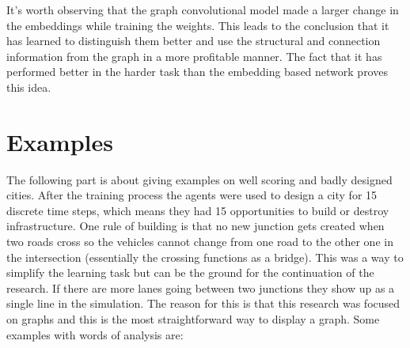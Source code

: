 \documentclass[
]{elteikthesis}[2023/04/10]
\begin{document}
It's worth observing that the graph convolutional model made a larger
change in the embeddings while training the weights. This leads to
the conclusion that it has learned to distinguish them better and
use the structural and connection information from the graph in a more profitable
manner. The fact that it has performed better in the harder task than
the embedding based network proves this idea.

\section{Examples}

The following part is about giving examples on well scoring and badly
designed cities. After the training process the agents were used to
design a city for 15 discrete time steps, which means they had 15
opportunities to build or destroy infrastructure. One rule of building
is that no new junction gets created when two roads cross so the
vehicles cannot change from one road to the other one in the intersection
(essentially the crossing functions as a bridge). This was a way to
simplify the learning task but can be the ground for the continuation
of the research. If there are more lanes going between two junctions
they show up as a single line in the simulation. The reason for this
is that this research was focused on graphs and this is the most straightforward
way to display a graph. Some examples with words of analysis are:
\end{document}
